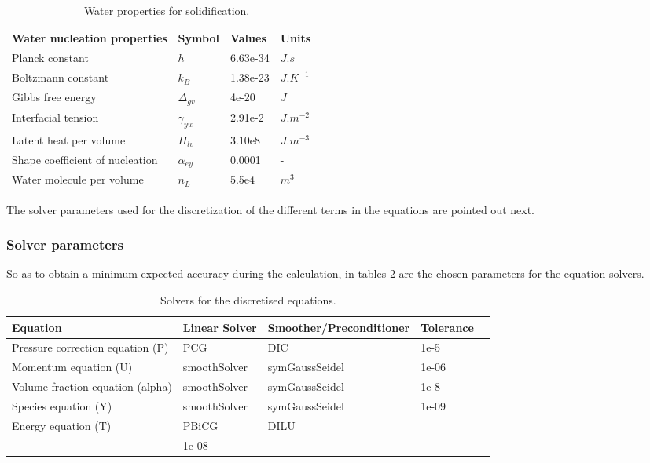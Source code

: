 \begin{table}[h!]
	\begin{tabular}{@{}lllll@{}}
		\toprule[1pt]
		\textbf{Water nucleation properties} & \textbf{Symbol} & \textbf{Values} & \textbf{Units} &  \\ \midrule[2pt]
		Planck constant & $h$ & 6.63e-34 & $J.s$ \\
		Boltzmann constant & $k_{B}$ & 1.38e-23 & $J.K^{-1}$ \\		
		Gibbs free energy & $\Delta_{gv}$ & 4e-20 & $J$ \\
		Interfacial tension & $\gamma_{yw}$ & 2.91e-2 & $J.m^{-2}$ \\		
		Latent heat per volume & $H_{lv}$ & 3.10e8 & $J.m^{-3}$ \\
		Shape coefficient of nucleation & $\alpha_{ey}$ & 0.0001 & - \\		
		Water molecule per volume & $n_{L}$ &  5.5e4  & $m^{3}$ \\		 \bottomrule[1pt]		
	\end{tabular}
	\centering
	\caption{Water properties for solidification.}	
	\label{3.11tab}
\end{table}
The solver parameters used for the discretization of the different terms in the equations are pointed out next. 

\subsubsection*{Solver parameters}
So as to obtain a minimum expected accuracy during the calculation, in tables \ref{3.13tab} are the chosen parameters for the equation solvers.
\clearpage
\begin{table}[h!]
\begin{adjustbox}{width=1\textwidth}
	\small		
	\begin{tabular}{@{}lllll@{}}
		\toprule[1pt]
		\textbf{Equation} & \textbf{Linear Solver} & \textbf{Smoother/Preconditioner} & \textbf{Tolerance} &  \\ \midrule[2pt]
		Pressure correction equation (P) & PCG & DIC & 1e-5 \\
		Momentum equation (U)& smoothSolver & symGaussSeidel  & 1e-06 \\
		Volume fraction equation (alpha) & smoothSolver & symGaussSeidel  & 1e-8 \\
		Species equation  (Y)   & smoothSolver   & symGaussSeidel &1e-09 \\		 
		Energy equation (T)    &  PBiCG  &  DILU\\ 
		&  1e-08  \\ \bottomrule[1pt]		
	\end{tabular}
\end{adjustbox}
	\centering
	\caption{Solvers for the discretised equations.}	
	\label{3.13tab}
\end{table}

